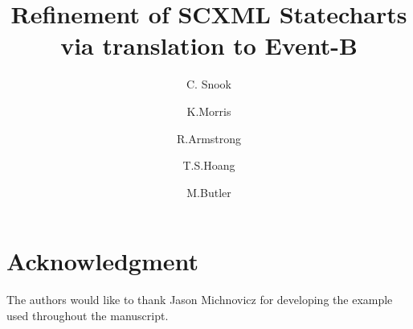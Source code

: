 \documentclass[runningheads,a4paper]{llncs}
\begin{document}
\mainmatter  %

\title{Refinement of SCXML Statecharts via translation to Event-B}


%
\author{C. Snook  %
\and K.Morris     
\and R.Armstrong 
\and T.S.Hoang   
\and M.Butler     
}




\maketitle

\resetabbrev



















\section*{Acknowledgment} The authors would like to thank Jason Michnovicz for developing the \IDS example used throughout the manuscript.
\end{document}
